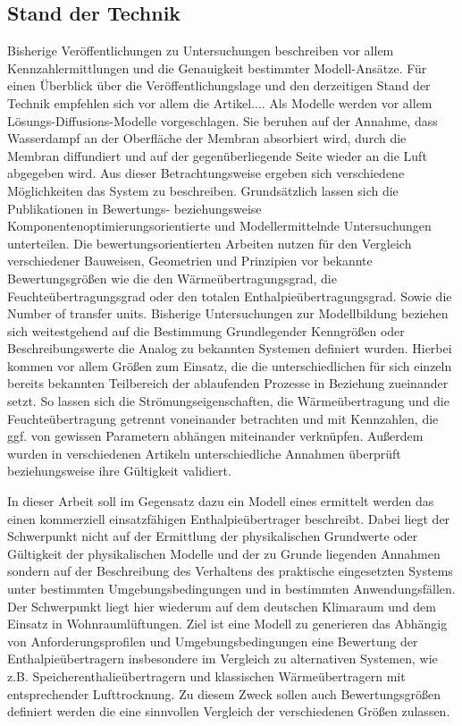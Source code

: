 \begin{normalsize}
\begin{LARGE}
\section{Stand der Technik}

Bisherige Veröffentlichungen zu Untersuchungen beschreiben vor allem Kennzahlermittlungen und die Genauigkeit bestimmter Modell-Ansätze. Für einen Überblick über die Veröffentlichungslage und den derzeitigen Stand der Technik empfehlen sich vor allem die Artikel....
Als Modelle werden vor allem Lösungs-Diffusions-Modelle vorgeschlagen. Sie beruhen auf der Annahme, dass Wasserdampf an der Oberfläche der Membran absorbiert wird, durch die Membran diffundiert und auf der gegenüberliegende Seite wieder an die Luft abgegeben wird. Aus dieser Betrachtungsweise ergeben sich verschiedene Möglichkeiten das System zu beschreiben. 
Grundsätzlich lassen sich die Publikationen in Bewertungs- beziehungsweise Komponentenoptimierungsorientierte und Modellermittelnde Untersuchungen unterteilen. Die bewertungsorientierten Arbeiten nutzen für den Vergleich verschiedener Bauweisen, Geometrien und Prinzipien vor bekannte Bewertungsgrößen wie die den Wärmeübertragungsgrad, die Feuchteübertragungsgrad oder den totalen Enthalpieübertragungsgrad. Sowie die Number of transfer units.
Bisherige Untersuchungen zur Modellbildung beziehen sich weitestgehend auf die Bestimmung Grundlegender Kenngrößen oder Beschreibungswerte die Analog zu bekannten Systemen definiert wurden. Hierbei kommen vor allem Größen zum Einsatz, die die unterschiedlichen für sich einzeln bereits bekannten Teilbereich der ablaufenden Prozesse in Beziehung zueinander setzt. So lassen sich  die Strömungseigenschaften, die Wärmeübertragung und die Feuchteübertragung getrennt voneinander betrachten und mit Kennzahlen, die ggf. von gewissen Parametern abhängen miteinander verknüpfen. Außerdem wurden in verschiedenen Artikeln unterschiedliche Annahmen überprüft beziehungsweise ihre Gültigkeit validiert. 

In dieser Arbeit soll im Gegensatz dazu ein Modell eines ermittelt werden das einen kommerziell einsatzfähigen Enthalpieübertrager beschreibt. Dabei liegt der Schwerpunkt nicht auf der Ermittlung der physikalischen Grundwerte oder Gültigkeit der physikalischen Modelle  und der zu Grunde liegenden Annahmen sondern auf der Beschreibung des Verhaltens des praktische eingesetzten Systems unter bestimmten Umgebungsbedingungen und in bestimmten Anwendungsfällen. Der Schwerpunkt liegt hier wiederum auf dem deutschen Klimaraum und dem Einsatz in Wohnraumlüftungen. 
Ziel ist eine Modell zu generieren das Abhängig von Anforderungsprofilen und Umgebungsbedingungen eine Bewertung der Enthalpieübertragern insbesondere im Vergleich zu alternativen Systemen, wie z.B. Speicherenthalieübertragern und klassischen Wärmeübertragern mit entsprechender Lufttrocknung. Zu diesem Zweck sollen auch Bewertungsgrößen definiert werden die eine sinnvollen Vergleich der verschiedenen Größen zulassen. 





\end{LARGE}
\end{normalsize}
